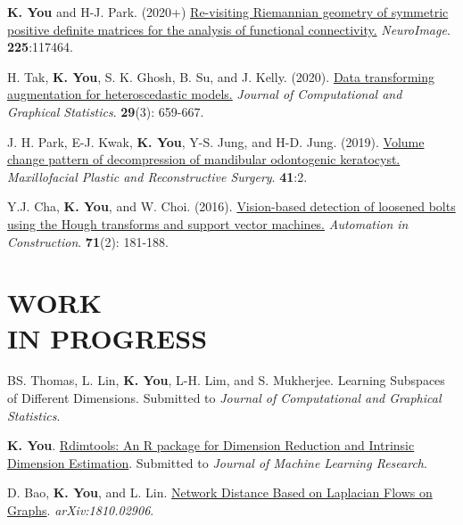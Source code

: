 \documentclass[margin, 10pt]{res} %
\begin{document}
\begin{resume}
\begin{enumerate}[label={[\arabic*]}]
	\item {\bf K. You} and H-J. Park. (2020+) \href{https://doi.org/10.1016/j.neuroimage.2020.117464}{Re-visiting Riemannian geometry of symmetric positive definite matrices for the analysis of functional connectivity.} \textit{NeuroImage}. {\bf 225}:117464.
	\item H. Tak, {\bf K. You}, S. K. Ghosh, B. Su, and J. Kelly. (2020). \href{https://doi.org/10.1080/10618600.2019.1704295}{Data transforming augmentation for heteroscedastic models.} {\it Journal of Computational and Graphical Statistics}. {\bf 29}(3): 659-667. 
	\item J. H. Park, E-J. Kwak, {\bf K. You}, Y-S. Jung, and H-D. Jung. (2019).
	\href{https://rdcu.be/bfKR8}{Volume change pattern of decompression of mandibular odontogenic keratocyst.} {\it Maxillofacial Plastic and Reconstructive Surgery}. {\bf 41}:2.	
	\item Y.J. Cha, {\bf K. You}, and W. Choi. (2016). \href{https://doi.org/10.1016/j.autcon.2016.06.008}{Vision-based detection of loosened bolts using the Hough transforms and support vector machines.} {\it Automation in Construction}. {\bf 71}(2): 181-188.
\end{enumerate}
\vspace{.2cm}



\section{\sf WORK \\ IN PROGRESS} 

\begin{enumerate}[label={[\roman*]}] 
		\item BS. Thomas, L. Lin, \textbf{K. You}, L-H. Lim, and S. Mukherjee. Learning Subspaces of Different Dimensions. Submitted to \textit{Journal of Computational and Graphical Statistics}.
	\item \textbf{K. You}. \href{https://arxiv.org/abs/2005.11107}{Rdimtools: An R package for Dimension Reduction and Intrinsic Dimension Estimation}. Submitted to \textit{Journal of Machine Learning Research}.
	\item D. Bao, \textbf{K. You}, and L. Lin. \href{https://arxiv.org/abs/1810.02906}{Network Distance Based on Laplacian Flows on Graphs}. {\it arXiv:1810.02906}.
\end{enumerate}
\vspace{.2cm}




\end{resume}
\end{document}
